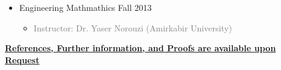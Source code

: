 \begin{itemize}
\begin{itemize}
		\item {} Engineering Mathmathics \hfill Fall 2013
		\begin{itemize} 
			\item\textcolor{gray}{Instructor: Dr. Yaser Norouzi (Amirkabir University)} 
		\end{itemize}
	
	\end{itemize}
\end{itemize}

\centerline{\underline{\textbf{	\faExclamationCircle \hspace{0.5 pt} References, Further information, and Proofs are available upon Request}}}
